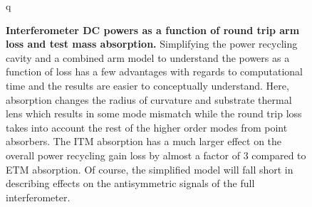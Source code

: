 \begin{figure}
\begin{minipage}{0.5\textheight}
	\end{minipage} q
	\caption[Interferometer DC powers as a function of round trip arm loss and test mass absorption.]  
	{\textbf{Interferometer DC powers as a function of round trip arm loss and test mass absorption.}
	Simplifying the power recycling cavity and a combined arm model to understand the powers as a function of loss has a few advantages with regards to computational time and the results are easier to conceptually understand.  Here, absorption changes the radius of curvature and substrate thermal lens which results in some mode mismatch while the round trip loss takes into account the rest of the higher order modes from point absorbers.  The ITM absorption has a much larger effect on the overall power recycling gain loss by almost a factor of 3 compared to ETM absorption.  Of course, the simplified model will fall short in describing effects on the antisymmetric signals of the full interferometer.
	}
	\label{fig:simple_prc_arm}
\end{figure}

